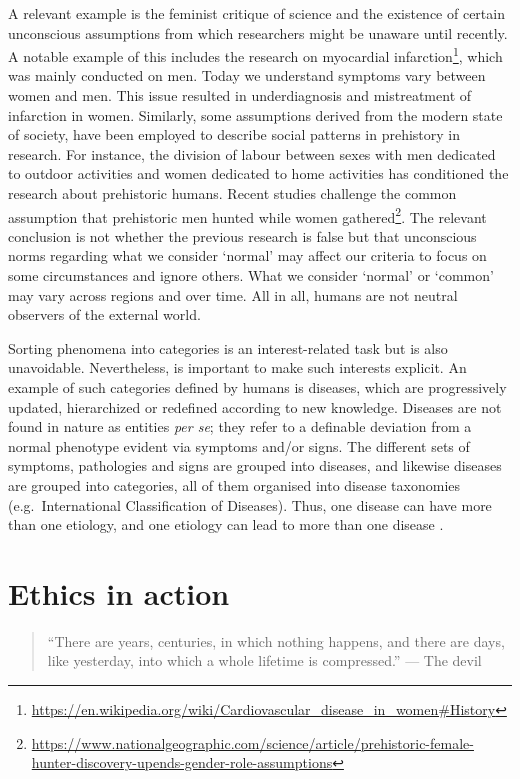 \documentclass[
  12pt,
]{book}
\DeclareRobustCommand{\href}[2]{#2\footnote{\url{#1}}}
\begin{document}
A relevant example is the feminist critique of science \citep{sep-feminist-science} and the existence of certain unconscious assumptions from which researchers might be unaware until recently. A notable example of this includes the research on \href{https://en.wikipedia.org/wiki/Cardiovascular_disease_in_women\#History}{myocardial infarction}, which was mainly conducted on men. Today we understand symptoms vary between women and men. This issue resulted in underdiagnosis and mistreatment of infarction in women. Similarly, some assumptions derived from the modern state of society, have been employed to describe social patterns in prehistory in research. For instance, the division of labour between sexes with men dedicated to outdoor activities and women dedicated to home activities has conditioned the research about prehistoric humans. Recent studies \href{https://www.nationalgeographic.com/science/article/prehistoric-female-hunter-discovery-upends-gender-role-assumptions}{challenge the common assumption that prehistoric men hunted while women gathered}. The relevant conclusion is not whether the previous research is false but that unconscious norms regarding what we consider `normal' may affect our criteria to focus on some circumstances and ignore others. What we consider `normal' or `common' may vary across regions and over time. All in all, humans are not neutral observers of the external world.

Sorting phenomena into categories is an interest-related task \citep{johansson2016philosophy} but is also unavoidable. Nevertheless, is important to make such interests explicit. An example of such categories defined by humans is diseases, which are progressively updated, hierarchized or redefined according to new knowledge. Diseases are not found in nature as entities \emph{per se}; they refer to a definable deviation from a normal phenotype evident via symptoms and/or signs. The different sets of symptoms, pathologies and signs are grouped into diseases, and likewise diseases are grouped into categories, all of them organised into disease taxonomies (e.g.~International Classification of Diseases). Thus, one disease can have more than one etiology, and one etiology can lead to more than one disease \citep{vega2021hume}.

\section{Ethics in action}\label{ethics-in-action}

\begin{quote}
``There are years, centuries, in which nothing happens, and there are days, like yesterday, into which a whole lifetime is compressed.'' --- The devil \citep{vanwestrum1908devil}
\end{quote}
\end{document}
